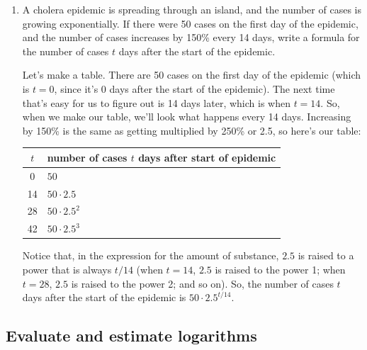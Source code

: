\documentclass{article}
\theoremstyle{theorem}
\begin{document}
\begin{enumerate}
\item 

  \begin{problem}
    A cholera epidemic is spreading through an island, and the number of cases is growing exponentially. If there were 50 cases on the first day of the epidemic, and the number of cases increases by 150\% every 14 days, write a formula for the number of cases $t$ days after the start of the epidemic.
  \end{problem}

  \begin{solution}
    Let's make a table. There are 50 cases on the first day of the epidemic (which is $t = 0$, since it's 0 days after the start of the epidemic). The next time that's easy for us to figure out is 14 days later, which is when $t = 14$. So, when we make our table, we'll look what happens every 14 days. Increasing by 150\% is the same as getting multiplied by 250\% or 2.5, so here's our table:
    \begin{center}
      \begin{tabular}{c | l}
        $t$ & number of cases $t$ days after start of epidemic \\
        \hline
        0 & $50$ \\
        14 & $50 \cdot 2.5$ \\
        28 & $50 \cdot 2.5^2$ \\
        42 & $50 \cdot 2.5^3$
      \end{tabular}
    \end{center}
    Notice that, in the expression for the amount of substance, $2.5$ is raised to a power that is always $t / 14$ (when $t = 14$, $2.5$ is raised to the power 1; when $t = 28$, $2.5$ is raised to the power 2; and so on). So, the number of cases $t$ days after the start of the epidemic is $\boxed{50 \cdot 2.5^{t/14}}$.
  \end{solution}

\end{enumerate}

\subsection*{Evaluate and estimate logarithms}
\end{document}
